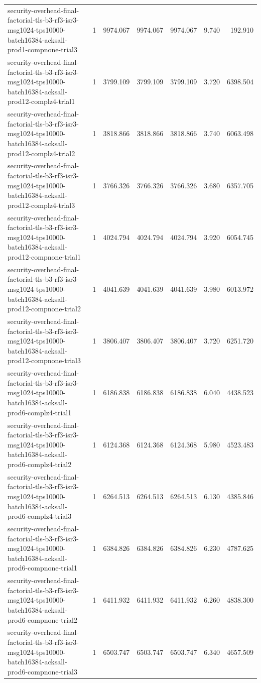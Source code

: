 \begin{tabular}{lrrrrrr}
security-overhead-final-factorial-tls-b3-rf3-isr3-msg1024-tps10000-batch16384-acksall-prod1-compnone-trial3 & 1 & 9974.067 & 9974.067 & 9974.067 & 9.740 & 192.910 \\
security-overhead-final-factorial-tls-b3-rf3-isr3-msg1024-tps10000-batch16384-acksall-prod12-complz4-trial1 & 1 & 3799.109 & 3799.109 & 3799.109 & 3.720 & 6398.504 \\
security-overhead-final-factorial-tls-b3-rf3-isr3-msg1024-tps10000-batch16384-acksall-prod12-complz4-trial2 & 1 & 3818.866 & 3818.866 & 3818.866 & 3.740 & 6063.498 \\
security-overhead-final-factorial-tls-b3-rf3-isr3-msg1024-tps10000-batch16384-acksall-prod12-complz4-trial3 & 1 & 3766.326 & 3766.326 & 3766.326 & 3.680 & 6357.705 \\
security-overhead-final-factorial-tls-b3-rf3-isr3-msg1024-tps10000-batch16384-acksall-prod12-compnone-trial1 & 1 & 4024.794 & 4024.794 & 4024.794 & 3.920 & 6054.745 \\
security-overhead-final-factorial-tls-b3-rf3-isr3-msg1024-tps10000-batch16384-acksall-prod12-compnone-trial2 & 1 & 4041.639 & 4041.639 & 4041.639 & 3.980 & 6013.972 \\
security-overhead-final-factorial-tls-b3-rf3-isr3-msg1024-tps10000-batch16384-acksall-prod12-compnone-trial3 & 1 & 3806.407 & 3806.407 & 3806.407 & 3.720 & 6251.720 \\
security-overhead-final-factorial-tls-b3-rf3-isr3-msg1024-tps10000-batch16384-acksall-prod6-complz4-trial1 & 1 & 6186.838 & 6186.838 & 6186.838 & 6.040 & 4438.523 \\
security-overhead-final-factorial-tls-b3-rf3-isr3-msg1024-tps10000-batch16384-acksall-prod6-complz4-trial2 & 1 & 6124.368 & 6124.368 & 6124.368 & 5.980 & 4523.483 \\
security-overhead-final-factorial-tls-b3-rf3-isr3-msg1024-tps10000-batch16384-acksall-prod6-complz4-trial3 & 1 & 6264.513 & 6264.513 & 6264.513 & 6.130 & 4385.846 \\
security-overhead-final-factorial-tls-b3-rf3-isr3-msg1024-tps10000-batch16384-acksall-prod6-compnone-trial1 & 1 & 6384.826 & 6384.826 & 6384.826 & 6.230 & 4787.625 \\
security-overhead-final-factorial-tls-b3-rf3-isr3-msg1024-tps10000-batch16384-acksall-prod6-compnone-trial2 & 1 & 6411.932 & 6411.932 & 6411.932 & 6.260 & 4838.300 \\
security-overhead-final-factorial-tls-b3-rf3-isr3-msg1024-tps10000-batch16384-acksall-prod6-compnone-trial3 & 1 & 6503.747 & 6503.747 & 6503.747 & 6.340 & 4657.509 \\

\end{tabular}
